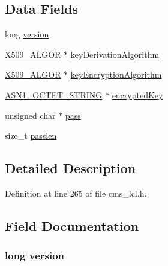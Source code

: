 \subsection*{Data Fields}
\begin{DoxyCompactItemize}
\item 
long \hyperlink{struct_c_m_s___password_recipient_info__st_a17afc5cf84cee4b2123665f28ce85c9f}{version}
\item 
\hyperlink{crypto_2ossl__typ_8h_aa2b6185e6254f36f709cd6577fb5022e}{X509\+\_\+\+A\+L\+G\+OR} $\ast$ \hyperlink{struct_c_m_s___password_recipient_info__st_af8412631bc604b6e3ca5b50577f1a470}{key\+Derivation\+Algorithm}
\item 
\hyperlink{crypto_2ossl__typ_8h_aa2b6185e6254f36f709cd6577fb5022e}{X509\+\_\+\+A\+L\+G\+OR} $\ast$ \hyperlink{struct_c_m_s___password_recipient_info__st_a02978e07483f6746f4f14141279dc4bb}{key\+Encryption\+Algorithm}
\item 
\hyperlink{crypto_2ossl__typ_8h_afbd05e94e0f0430a2b729473efec88c1}{A\+S\+N1\+\_\+\+O\+C\+T\+E\+T\+\_\+\+S\+T\+R\+I\+NG} $\ast$ \hyperlink{struct_c_m_s___password_recipient_info__st_a683d211b1506ecf342fb4d35a34aed33}{encrypted\+Key}
\item 
unsigned char $\ast$ \hyperlink{struct_c_m_s___password_recipient_info__st_a17d13e8afc00bfc1586fefbc7259b6b2}{pass}
\item 
size\+\_\+t \hyperlink{struct_c_m_s___password_recipient_info__st_a7ee586ed031baaf4721dac696a3ad72b}{passlen}
\end{DoxyCompactItemize}


\subsection{Detailed Description}


Definition at line 265 of file cms\+\_\+lcl.\+h.



\subsection{Field Documentation}
\subsubsection[{\texorpdfstring{version}{version}}]{\setlength{\rightskip}{0pt plus 5cm}long version}\hypertarget{struct_c_m_s___password_recipient_info__st_a17afc5cf84cee4b2123665f28ce85c9f}{}\label{struct_c_m_s___password_recipient_info__st_a17afc5cf84cee4b2123665f28ce85c9f}


